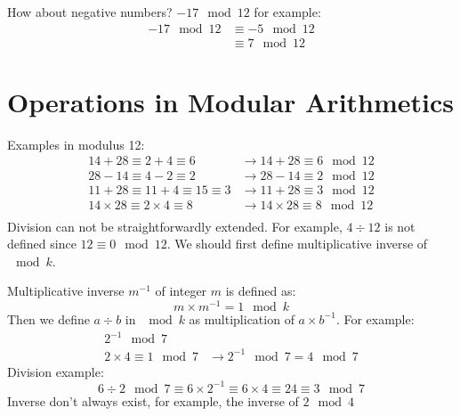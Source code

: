\noindent How about negative numbers? $-17 \mod{12} $ for example:
\begin{equation}
\begin{split}
-17 \mod{12} & \equiv -5\mod{12}\\
 & \equiv 7 \mod{12}
\end{split}
\end{equation}
\section{Operations in Modular Arithmetics}
Examples in modulus 12:
\begin{equation}
	\begin{split}
		14+28\equiv 2+4 \equiv 6 & \rightarrow 14+28 \equiv 6\mod{12}\\
		28-14\equiv 4-2 \equiv 2 & \rightarrow 28-14 \equiv 2\mod{12}\\
		11+28\equiv 11+4 \equiv 15 \equiv 3 & \rightarrow 11+28 \equiv 3\mod{12}\\
		14\times28\equiv 2\times4 \equiv 8 & \rightarrow 14\times28 \equiv 8\mod{12}\\
	\end{split}
\end{equation}
Division can not be straightforwardly extended. For example, $4\div 12$ is not defined since $12\equiv 0 \mod 12$. We should first define multiplicative inverse of $\mod k$.
\vspace{5mm}

\noindent Multiplicative inverse $m^{-1}$ of integer $m$ is defined as:
\begin{equation}
	m\times m^{-1} = 1 \mod k
\end{equation}
Then we define $a\div b$ in $\mod k$ as multiplication of $a\times b^{-1}$. For example:
\begin{equation}
	\begin{split}
		2^{-1} \mod 7 & \\
		2 \times 4 \equiv 1 \mod 7 & \rightarrow 2^{-1} \mod 7 = 4 \mod 7
	\end{split}
\end{equation}
Division example:
\begin{equation}
6 \div 2 \mod 7 \equiv 6 \times 2^{-1} \equiv 6\times 4 \equiv 24 \equiv 3 \mod 7
\end{equation}
Inverse don't always exist, for example, the inverse of $2 \mod 4$